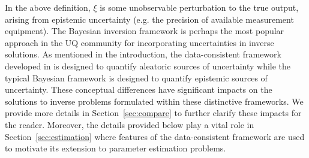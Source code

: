 In the above definition, $\xi$ is some unobservable perturbation to the true output, arising from epistemic uncertainty (e.g. the precision of available measurement equipment).
The Bayesian inversion framework  is perhaps the most popular approach in the UQ community for incorporating uncertainties in inverse solutions.
As mentioned in the introduction, the data-consistent framework developed in \cite{BJW18a, BJW18b, BWY20} is designed to quantify aleatoric sources of uncertainty while the typical Bayesian framework \cite{0266-5611-7-5-003,
 Kennedy_O_JRSSSB_2001,Tarantola_book, MNR07, CDS10,starktenorio,
 AlexanderianPetraStadlerEtAl14, Bui-ThanhGhattas14, Ernst2014,
 0266-5611-30-11-110301, ROM:CMW_2016,Stuart10,
 cockayneoatessullivangirolami} is designed to quantify epistemic sources of uncertainty.
These conceptual differences have significant impacts on the solutions to inverse problems formulated within these distinctive frameworks.
We provide more details in Section~\ref{sec:compare} to further clarify these impacts for the reader.
Moreover, the details provided below play a vital role in Section~\ref{sec:estimation} where features of the data-consistent framework are used to motivate its extension to parameter estimation problems.

\FloatBarrier
